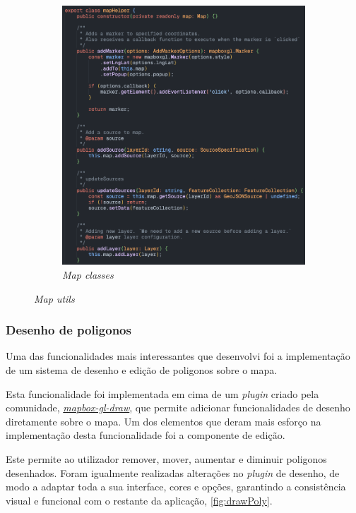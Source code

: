 \begin{figure}[!h]
\begin{subfigure}[c]{0.40\textwidth}
		\includegraphics[width=\textwidth]{figs/mapClasses.png}
		\caption{\textit{Map classes}}
		\label{fig:mapClasses}
	\end{subfigure}
	\caption{\textit{Map utils}}
    \label{fig:mapUtils}
\end{figure}

\clearpage

\subsubsection{\textbf{Desenho de poligonos}}\label{sec:polyDraw}
Uma das funcionalidades mais interessantes que desenvolvi foi a implementação de um sistema de desenho e edição de poligonos sobre o mapa.

Esta funcionalidade foi implementada em cima de um \textit{plugin} criado pela comunidade, \href{https://docs.mapbox.com/mapbox-gl-js/example/mapbox-gl-draw/}{\textit{mapbox-gl-draw}}, que permite adicionar funcionalidades de desenho diretamente sobre o mapa. Um dos elementos que deram mais esforço na implementação desta funcionalidade foi a componente de edição. 

Este permite ao utilizador remover, mover, aumentar e diminuir poligonos desenhados. Foram igualmente realizadas alterações no \textit{plugin} de desenho, de modo a adaptar toda a sua interface, cores e opções, garantindo a consistência visual e funcional com o restante da aplicação, \autoref{fig:drawPoly}.

